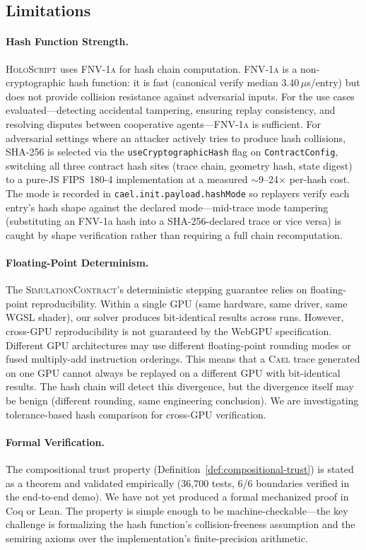 \documentclass[sigchi-a]{acmart}
\newcommand{\holoscript}{\textsc{HoloScript}}
\newcommand{\cael}{\textsc{Cael}}
\newcommand{\fnvhash}{\textsc{FNV-1a}}
\newcommand{\simcontract}{\textsc{SimulationContract}}
\begin{document}
\subsection{Limitations}

\paragraph{Hash Function Strength.}
\holoscript{} uses \fnvhash{} for hash chain computation. \fnvhash{} is a
non-cryptographic hash function: it is fast (canonical verify median 3.40\,$\mu$s/entry)
but does not provide collision resistance against
adversarial inputs. For the use cases evaluated---detecting accidental
tampering, ensuring replay consistency, and resolving disputes between
cooperative agents---\fnvhash{} is sufficient. For adversarial settings
where an attacker actively tries to produce hash collisions, SHA-256 is
selected via the \texttt{useCryptographicHash} flag on
\texttt{ContractConfig}, switching all three contract hash sites (trace
chain, geometry hash, state digest) to a pure-JS FIPS~180-4
implementation at a measured $\sim$9--24$\times$ per-hash cost. The mode
is recorded in \texttt{cael.init.payload.hashMode} so replayers verify
each entry's hash shape against the declared mode---mid-trace mode
tampering (substituting an FNV-1a hash into a SHA-256-declared trace or
vice versa) is caught by shape verification rather than requiring a
full chain recomputation.

\paragraph{Floating-Point Determinism.}
The \simcontract{}'s deterministic stepping guarantee relies on
floating-point reproducibility. Within a single GPU (same hardware, same
driver, same WGSL shader), our solver produces bit-identical results across
runs. However, cross-GPU reproducibility is not guaranteed by the WebGPU
specification. Different GPU architectures may use different floating-point
rounding modes or fused multiply-add instruction orderings. This means that
a \cael{} trace generated on one GPU cannot always be replayed on a
different GPU with bit-identical results. The hash chain will detect this
divergence, but the divergence itself may be benign (different rounding,
same engineering conclusion). We are investigating tolerance-based hash
comparison for cross-GPU verification.

\paragraph{Formal Verification.}
The compositional trust property (Definition~\ref{def:compositional-trust})
is stated as a theorem and validated empirically (36,700 tests, 6/6
boundaries verified in the end-to-end demo). We have not yet produced a
formal mechanized proof in Coq or Lean. The property is simple enough to
be machine-checkable---the key challenge is formalizing the hash function's
collision-freeness assumption and the semiring axioms over the
implementation's finite-precision arithmetic.
\end{document}

